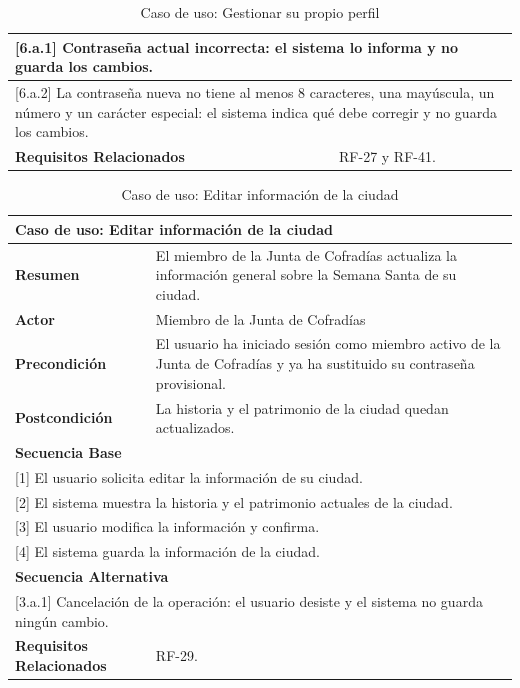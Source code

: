 \begin{table}[h!]
\begin{tabular}{|p{4cm}|p{11cm}|}
        \hline
        \multicolumn{2}{|p{15cm}|}{ [6.a.1] Contraseña actual incorrecta: el sistema lo informa y no guarda los cambios. } \\
        \hline
        \multicolumn{2}{|p{15cm}|}{ [6.a.2] La contraseña nueva no tiene al menos 8 caracteres, una mayúscula, un número y un carácter especial: el sistema indica qué debe corregir y no guarda los cambios. } \\
        \hline
        \textbf{Requisitos Relacionados} & RF-27 y RF-41. \\
        \hline
    \end{tabular}
    \caption{Caso de uso: Gestionar su propio perfil}
\end{table}

\begin{table}[h!]
    \centering
    \renewcommand{\arraystretch}{1.5}

    \begin{tabular}{|p{4cm}|p{11cm}|}
        \hline
        \multicolumn{2}{|l|}{\textbf{Caso de uso: Editar información de la ciudad}} \\
        \hline
        \textbf{Resumen} & El miembro de la Junta de Cofradías actualiza la información general sobre la Semana Santa de su ciudad. \\
        \hline
        \textbf{Actor} & Miembro de la Junta de Cofradías \\
        \hline
        \textbf{Precondición} & El usuario ha iniciado sesión como miembro activo de la Junta de Cofradías y ya ha sustituido su contraseña provisional. \\
        \hline
        \textbf{Postcondición} & La historia y el patrimonio de la ciudad quedan actualizados. \\
        \hline
        \multicolumn{2}{|l|}{\textbf{Secuencia Base}} \\
        \hline
        \multicolumn{2}{|p{15cm}|}{ [1] El usuario solicita editar la información de su ciudad. } \\
        \hline
        \multicolumn{2}{|p{15cm}|}{ [2] El sistema muestra la historia y el patrimonio actuales de la ciudad. } \\
        \hline
        \multicolumn{2}{|p{15cm}|}{ [3] El usuario modifica la información y confirma. } \\
        \hline
        \multicolumn{2}{|p{15cm}|}{ [4] El sistema guarda la información de la ciudad. } \\
        \hline
        \multicolumn{2}{|l|}{\textbf{Secuencia Alternativa}} \\
        \hline
        \multicolumn{2}{|p{15cm}|}{ [3.a.1] Cancelación de la operación: el usuario desiste y el sistema no guarda ningún cambio. } \\
        \hline
        \textbf{Requisitos Relacionados} & RF-29. \\
        \hline
    \end{tabular}
    \caption{Caso de uso: Editar información de la ciudad}
\end{table}

